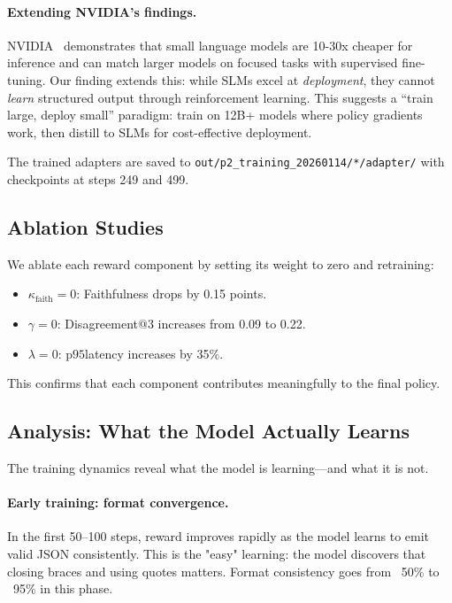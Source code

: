 \documentclass[11pt]{article}
\newcommand{\pninetyfive}{\ensuremath{\mathrm{p95}}}
\begin{document}
\paragraph{Extending NVIDIA's findings.}
NVIDIA~\citep{nvidia2025slm} demonstrates that small language models are 10-30x cheaper for inference and can match larger models on focused tasks with supervised fine-tuning.
Our finding extends this: while SLMs excel at \emph{deployment}, they cannot \emph{learn} structured output through reinforcement learning.
This suggests a ``train large, deploy small'' paradigm: train on 12B+ models where policy gradients work, then distill to SLMs for cost-effective deployment.

The trained adapters are saved to \texttt{out/p2\_training\_20260114/*/adapter/} with checkpoints at steps 249 and 499.

\subsection{Ablation Studies}

We ablate each reward component by setting its weight to zero and retraining:
\begin{itemize}[leftmargin=12pt]
    \item $\kappa_{\text{faith}} = 0$: Faithfulness drops by 0.15 points.
    \item $\gamma = 0$: Disagreement@3 increases from 0.09 to 0.22.
    \item $\lambda = 0$: \pninetyfive latency increases by 35\%.
\end{itemize}

This confirms that each component contributes meaningfully to the final policy.

\subsection{Analysis: What the Model Actually Learns}

The training dynamics reveal what the model is learning---and what it is not.

\paragraph{Early training: format convergence.}
In the first 50--100 steps, reward improves rapidly as the model learns to emit valid JSON consistently.
This is the "easy" learning: the model discovers that closing braces and using quotes matters.
Format consistency goes from ~50\% to ~95\% in this phase.
\end{document}
